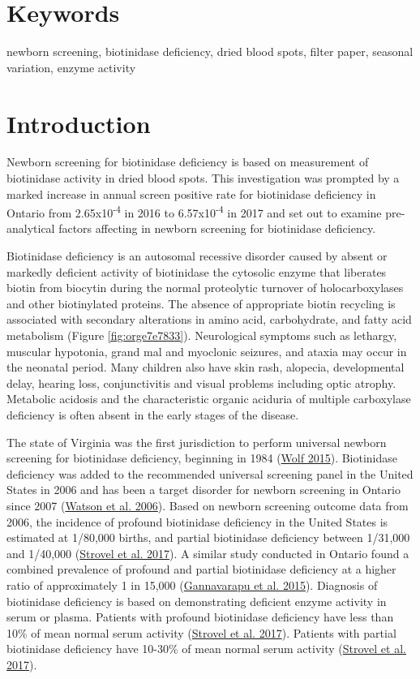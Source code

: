 \documentclass[review]{elsarticle}
\begin{document}
\section*{Keywords}
\label{sec:orgc917854}
newborn screening, biotinidase deficiency, dried blood spots, filter
paper, seasonal variation, enzyme activity
\section*{Introduction}
\label{sec:org484c345}

Newborn screening for biotinidase deficiency is based on measurement
of biotinidase activity in dried blood spots. This investigation was
prompted by a marked increase in annual screen positive rate for
biotinidase deficiency in Ontario from 2.65x10\textsuperscript{-4} in 2016 to
6.57x10\textsuperscript{-4} in 2017 and set out to examine pre-analytical factors
affecting in newborn screening for biotinidase deficiency.

Biotinidase deficiency is an autosomal recessive disorder caused by
absent or markedly deficient activity of biotinidase the cytosolic
enzyme that liberates biotin from biocytin during the normal
proteolytic turnover of holocarboxylases and other biotinylated
proteins. The absence of appropriate biotin recycling is associated
with secondary alterations in amino acid, carbohydrate, and fatty acid
metabolism (Figure \ref{fig:orge7e7833}). Neurological symptoms such as lethargy,
muscular hypotonia, grand mal and myoclonic seizures, and ataxia may
occur in the neonatal period. Many children also have skin rash,
alopecia, developmental delay, hearing loss, conjunctivitis and visual
problems including optic atrophy. Metabolic acidosis and the
characteristic organic aciduria of multiple carboxylase deficiency is
often absent in the early stages of the disease.

The state of Virginia was the first jurisdiction to perform universal
newborn screening for biotinidase deficiency, beginning in 1984 (\hyperlink{citeproc_bib_item_15}{Wolf 2015}). Biotinidase deficiency was added to the recommended
universal screening panel in the United States in 2006 and has been a
target disorder for newborn screening in Ontario since 2007 (\hyperlink{citeproc_bib_item_13}{Watson et al. 2006}).  Based on newborn screening outcome data from
2006, the incidence of profound biotinidase deficiency in the United
States is estimated at 1/80,000 births, and partial biotinidase
deficiency between 1/31,000 and 1/40,000 (\hyperlink{citeproc_bib_item_10}{Strovel et al. 2017}). A
similar study conducted in Ontario found a combined prevalence of
profound and partial biotinidase deficiency at a higher ratio of
approximately 1 in 15,000 (\hyperlink{citeproc_bib_item_5}{Gannavarapu et al. 2015}).  Diagnosis of
biotinidase deficiency is based on demonstrating deficient enzyme
activity in serum or plasma. Patients with profound biotinidase
deficiency have less than 10\% of mean normal serum activity (\hyperlink{citeproc_bib_item_10}{Strovel et al. 2017}). Patients with partial biotinidase deficiency have
10-30\% of mean normal serum activity (\hyperlink{citeproc_bib_item_10}{Strovel et al. 2017}). 
\end{document}
